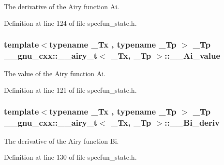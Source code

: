The derivative of the Airy function Ai. 



Definition at line 124 of file specfun\+\_\+state.\+h.

\subsubsection[{\texorpdfstring{\+\_\+\+\_\+\+Ai\+\_\+value}{__Ai_value}}]{\setlength{\rightskip}{0pt plus 5cm}template$<$typename \+\_\+\+Tx , typename \+\_\+\+Tp $>$ \+\_\+\+Tp {\bf \+\_\+\+\_\+gnu\+\_\+cxx\+::\+\_\+\+\_\+airy\+\_\+t}$<$ \+\_\+\+Tx, \+\_\+\+Tp $>$\+::\+\_\+\+\_\+\+Ai\+\_\+value}\hypertarget{struct____gnu__cxx_1_1____airy__t_a2a22c1c3bab509b44e7093c3691d9b13}{}\label{struct____gnu__cxx_1_1____airy__t_a2a22c1c3bab509b44e7093c3691d9b13}


The value of the Airy function Ai. 



Definition at line 121 of file specfun\+\_\+state.\+h.

\subsubsection[{\texorpdfstring{\+\_\+\+\_\+\+Bi\+\_\+deriv}{__Bi_deriv}}]{\setlength{\rightskip}{0pt plus 5cm}template$<$typename \+\_\+\+Tx , typename \+\_\+\+Tp $>$ \+\_\+\+Tp {\bf \+\_\+\+\_\+gnu\+\_\+cxx\+::\+\_\+\+\_\+airy\+\_\+t}$<$ \+\_\+\+Tx, \+\_\+\+Tp $>$\+::\+\_\+\+\_\+\+Bi\+\_\+deriv}\hypertarget{struct____gnu__cxx_1_1____airy__t_ad37670f1ff4859ff7bddf6875dbaee92}{}\label{struct____gnu__cxx_1_1____airy__t_ad37670f1ff4859ff7bddf6875dbaee92}


The derivative of the Airy function Bi. 



Definition at line 130 of file specfun\+\_\+state.\+h.

